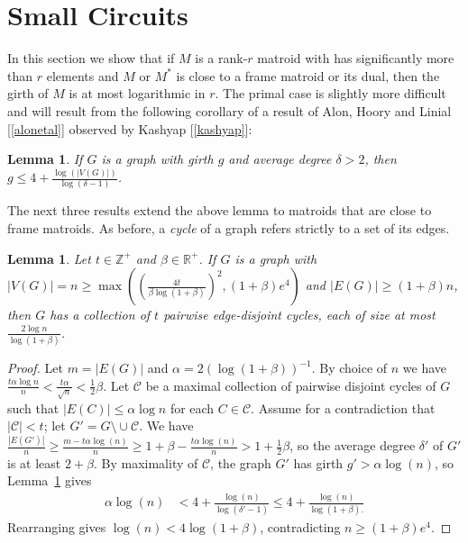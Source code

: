 \documentclass[12pt]{amsart}
\newtheorem{lemma}[theorem]{Lemma}
\theoremstyle{definition}
\newcommand{\bR}{\mathbb R}
\newcommand{\bZ}{\mathbb Z}
\newcommand{\cC}{\mathcal{C}}
\newcommand{\del}{\!\setminus\!}
\begin{document}
\section{Small Circuits}

  In this section we show that if $M$ is a rank-$r$ matroid with has significantly more than $r$ elements and $M$ or $M^*$ is close to a frame matroid or its dual, then the girth of $M$ is at most logarithmic in $r$. The primal case is slightly more difficult and will result from the following corollary of a result of Alon, Hoory and Linial [\ref{alonetal}] observed by Kashyap [\ref{kashyap}]:
    
  \begin{lemma}\label{moore}
    If $G$ is a graph with girth $g$ and average degree $\delta > 2$, then $g \le 4 + \tfrac{\log(|V(G)|)}{\log(\delta - 1)}$.
  \end{lemma}
  
  The next three results extend the above lemma to matroids that are close to frame matroids. As before, a \emph{cycle} of a graph refers strictly to a set of its edges. 
  
  \begin{lemma}\label{disjointcircuits}
    Let $t \in \bZ^+$ and $\beta \in \bR^+$. If $G$ is a graph with $|V(G)| =  n\ge \max\left(\left(\frac{4t}{\beta\log(1+\beta)}\right)^2,(1+\beta)e^4\right)$ and $|E(G)| \ge (1+\beta)n$, then $G$ has a collection of $t$ pairwise edge-disjoint cycles, each of size at most $\tfrac{2\log n}{\log(1+\beta)}$. 
  \end{lemma}
  \begin{proof}
    Let $m = |E(G)|$ and $\alpha = 2(\log(1+\beta))^{-1}$. By choice of $n$ we have $\frac{t \alpha \log n}{n} < \tfrac{t \alpha}{\sqrt{n}} < \tfrac{1}{2}\beta$.
     Let $\cC$ be a maximal collection of pairwise disjoint cycles of $G$ such that $|E(C)| \le \alpha \log n$ for each $C \in \cC$. Assume for a contradiction that $|\cC| < t$; let $G' = G \del \cup \cC$. We have $\tfrac{|E(G')|}{n} \ge \tfrac{m - t\alpha \log(n)}{n} \ge 1+\beta - \tfrac{t \alpha \log(n)}{n} > 1 + \tfrac{1}{2}\beta$, so the average degree $\delta'$ of $G'$ is at least $2 + \beta$. By maximality of $\cC$, the graph $G'$ has girth $g' > \alpha \log (n)$, so Lemma~\ref{moore} gives \begin{align*}
      \alpha \log(n)  &< 4 + \frac{\log(n)}{\log(\delta'-1)}  \le 4 + \frac{\log(n)}{\log(1+\beta).}
\end{align*}
  Rearranging gives $\log(n) < 4\log(1+\beta)$, contradicting $n \ge (1+\beta)e^4$.
  \end{proof}
  
\end{document}
